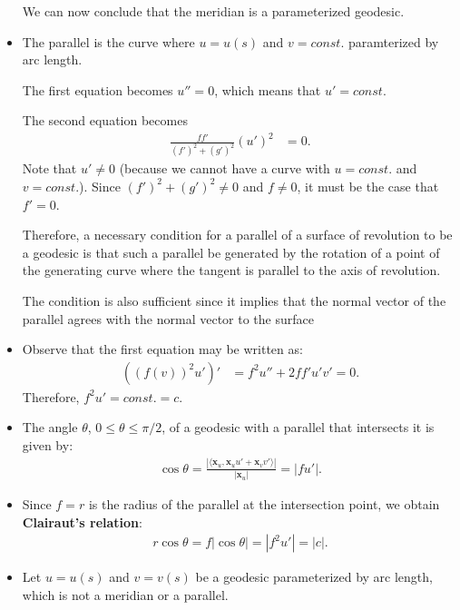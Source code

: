 \documentclass[10pt]{article}
\newcommand{\ve}[1]{\mathbf{#1}}
\begin{document}
\begin{itemize}
    We can now conclude that the meridian is a parameterized geodesic.

    \item The parallel is the curve where $u = u(s)$ and $v = const.$ paramterized by arc length. 

    The first equation becomes $u'' = 0$, which means that $u' = const.$

    The second equation becomes
    \begin{align*}
      \frac{ff'}{(f')^2 + (g')^2}(u')^2 &= 0.
    \end{align*}
    Note that $u' \neq 0$ (because we cannot have a curve with $u = const.$ and $v = const.$). Since $(f')^2 + (g')^2 \neq 0$ and $f \neq 0$, it must be the case that $f' = 0$.

    Therefore, a necessary condition for a parallel of a surface of revolution to be a geodesic is that such a parallel be generated by the rotation of a point of the generating curve where the tangent is parallel to the axis of revolution.

    The condition is also sufficient since it implies that the normal vector of the parallel agrees with the normal vector to the surface

    \item Observe that the first equation may be written as:
    \begin{align*}
      ((f(v))^2u')' 
      &= f^2 u'' + 2ff' u' v' = 0.
    \end{align*}
    Therefore, $f^2 u' = const. = c$.

    \item The angle $\theta$, $0 \leq \theta \leq \pi/2$, of a geodesic with a parallel that intersects it is given by:
    \begin{align*}
      \cos \theta = \frac{|\langle \ve{x}_u, \ve{x}_u u' + \ve{x}_v v' \rangle|}{|\ve{x}_u|} = |f u'|.
    \end{align*}

    \item Since $f = r$ is the radius of the parallel at the intersection point, we obtain {\bf Clairaut's relation}:
    \begin{align*}
      r \cos \theta = f | \cos \theta | = |f^2 u' | = |c|.
    \end{align*}

    \item Let $u = u(s)$ and $v = v(s)$ be a geodesic parameterized by arc length, which is not a meridian or a parallel.


\end{itemize}
\end{document}
